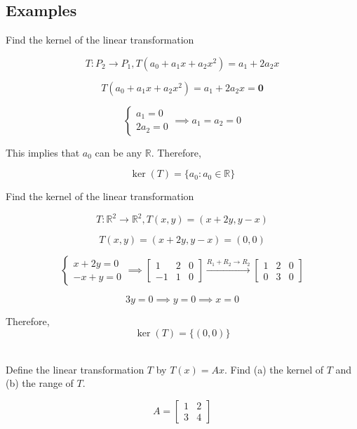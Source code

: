 \documentclass{report}
\begin{document}
\subsection{Examples}

\begin{tcolorbox}[colframe = lightred]
	Find the kernel of the linear transformation
	
	$$
	T: P_2 \to P_1, T(a_0 + a_1 x + a_2 x^2) = a_1 + 2a_2 x
	$$
	
\end{tcolorbox}

$$
T(a_0 + a_1 x+ a_2 x^2) = a_1 + 2a_2 x = \bm{0}
$$

$$
\begin{cases}
	a_1 = 0 \\ 2a_2 = 0 
\end{cases}
\implies a_1 = a_2 = 0
$$

\noindent This implies that $a_0$ can be any $\mathbb{R}$. Therefore,

$$
\ker (T)  = \{ a_0: a_0 \in \mathbb{R}\}
$$

\begin{tcolorbox}[colframe = lightred]
	Find the kernel of the linear transformation
	
	$$
	T: \mathbb{R}^2 \to \mathbb{R}^2, T(x,y) = (x+2y, y-x)
	$$
\end{tcolorbox}

$$
T(x,y) = (x+2y, y-x) = (0,0)
$$

$$
\begin{cases}
	x+2y = 0 \\ -x+y = 0
\end{cases} \implies \begin{bmatrix} 1 & 2 & 0 \\ -1 & 1 & 0 \end{bmatrix} \xrightarrow{R_1 + R_2 \to R_2}	\begin{bmatrix} 1 & 2 & 0 \\ 0 &3 & 0 \end{bmatrix} 
$$

$$
3y = 0 \implies y = 0 \implies x = 0
$$

\noindent Therefore, 
$$\ker(T) = \{ (0,0)\}$$\\

\begin{tcolorbox}[colframe = lightred]
	Define the linear transformation $T$ by $T(x) = Ax$. Find (a) the kernel of $T$ and (b) the range of $T$.
	
	$$
	A = \begin{bmatrix} 1 &2  \\ 3 &4 \end{bmatrix}
	$$
\end{tcolorbox}
\end{document}
